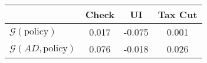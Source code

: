 \begin{tabular}{@{}lccc@{}} 
\toprule 
                          & Check      & UI    & Tax Cut    \\  \midrule 
$\mathcal{G}(\text{policy})$ & 0.017  & -0.075  & 0.001     \\ 
$\mathcal{G}(AD,\text{policy})$ & 0.076  & -0.018  & 0.026     \\ 
\end{tabular}  
